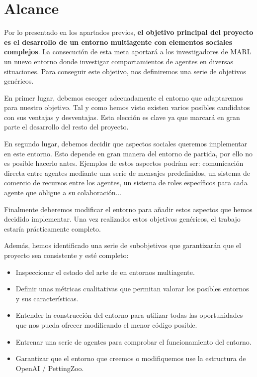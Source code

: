 \section{Alcance}
Por lo presentado en los apartados previos, \textbf{el objetivo principal del proyecto es el desarrollo de un entorno multiagente con elementos sociales complejos}. La consecución de esta meta aportará a los investigadores de MARL un nuevo entorno donde investigar comportamientos de agentes en diversas situaciones. Para conseguir este objetivo, nos definiremos una serie de objetivos genéricos.

En primer lugar, debemos escoger adecuadamente el entorno que adaptaremos para nuestro objetivo. Tal y como hemos visto existen varios posibles candidatos con sus ventajas y desventajas. Esta elección es clave ya que marcará en gran parte el desarrollo del resto del proyecto. 

En segundo lugar, debemos decidir que aspectos sociales queremos implementar en este entorno. Esto depende en gran manera del entorno de partida, por ello no es posible hacerlo antes. Ejemplos de estos aspectos podrían ser: comunicación directa entre agentes mediante una serie de mensajes predefinidos, un sistema de comercio de recursos entre los agentes, un sistema de roles específicos para cada agente que obligue a su colaboración... 

Finalmente deberemos modificar el entorno para añadir estos aspectos que hemos decidido implementar. Una vez realizados estos objetivos genéricos, el trabajo estaría prácticamente completo. 

Además, hemos identificado una serie de subobjetivos que garantizarán que el proyecto sea consistente y esté completo:

\begin{itemize}
    \item Inspeccionar el estado del arte de en entornos multiagente.
    \item Definir unas métricas cualitativas que permitan valorar los posibles entornos y sus características.
    \item Entender la construcción del entorno para utilizar todas las oportunidades que nos pueda ofrecer modificando el menor código posible.
    \item Entrenar una serie de agentes para comprobar el funcionamiento del entorno. 
    \item Garantizar que el entorno que creemos o modifiquemos use la estructura de OpenAI / PettingZoo.
\end{itemize}
 
